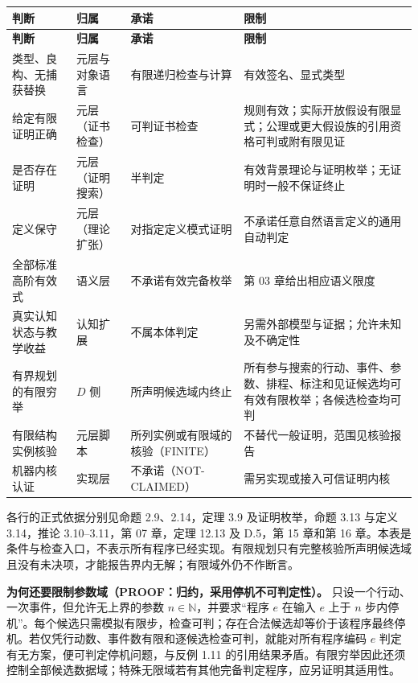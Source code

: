 \documentclass[UTF8,a4paper,zihao=-4,fontset=windows,openany]{ctexbook}
\begin{document}
\begingroup\small\setlength{\tabcolsep}{4pt}
\begin{longtable}{>{\raggedright\arraybackslash}p{}>{\raggedright\arraybackslash}p{}>{\raggedright\arraybackslash}p{}>{\raggedright\arraybackslash}p{}}
\toprule
\textbf{判断} & \textbf{归属} & \textbf{承诺} & \textbf{限制} \\
\midrule
\endfirsthead
\toprule
\textbf{判断} & \textbf{归属} & \textbf{承诺} & \textbf{限制} \\
\midrule
\endhead
\bottomrule
\endfoot
\bottomrule
\endlastfoot
类型、良构、无捕获替换 & 元层与对象语言 & 有限递归检查与计算 & 有效签名、显式类型 \\
给定有限证明正确 & 元层（证书检查） & 可判证书检查 & 规则有效；实际开放假设有限显式；公理或更大假设族的引用资格可判或附有限见证 \\
是否存在证明 & 元层（证明搜索） & 半判定 & 有效背景理论与证明枚举；无证明时一般不保证终止 \\
定义保守 & 元层（理论扩张） & 对指定定义模式证明 & 不承诺任意自然语言定义的通用自动判定 \\
全部标准高阶有效式 & 语义层 & 不承诺有效完备枚举 & 第 03 章给出相应语义限度 \\
真实认知状态与教学收益 & 认知扩展 & 不属本体判定 & 另需外部模型与证据；允许未知及不确定性 \\
有界规划的有限穷举 & \(D\) 侧 & 所声明候选域内终止 & 所有参与搜索的行动、事件、参数、排程、标注和见证候选均可有效有限枚举；各候选检查均可判 \\
有限结构实例核验 & 元层脚本 & 所列实例或有限域的核验（FINITE） & 不替代一般证明，范围见核验报告 \\
机器内核认证 & 实现层 & 不承诺（NOT-CLAIMED） & 需另实现或接入可信证明内核 \\
\end{longtable}
\endgroup

各行的正式依据分别见命题 2.9、2.14，定理 3.9 及证明枚举，命题 3.13 与定义 3.14，推论 3.10–3.11，第 07 章，定理 12.13 及 D.5，第 15 章和第 16 章。本表是条件与检查入口，不表示所有程序已经实现。有限规划只有完整核验所声明候选域且没有未决项，才能报告界内无解；有限域外仍不作断言。

\textbf{为何还要限制参数域（PROOF：归约，采用停机不可判定性）。} 只设一个行动、一次事件，但允许无上界的参数 \(n\in\mathbb N\)，并要求“程序 \(e\) 在输入 \(e\) 上于 \(n\) 步内停机”。每个候选只需模拟有限步，检查可判；存在合法候选却等价于该程序最终停机。若仅凭行动数、事件数有限和逐候选检查可判，就能对所有程序编码 \(e\) 判定有无方案，便可判定停机问题，与反例 1.11 的引用结果矛盾。有限穷举因此还须控制全部候选数据域；特殊无限域若有其他完备判定程序，应另证明其适用性。
\end{document}
